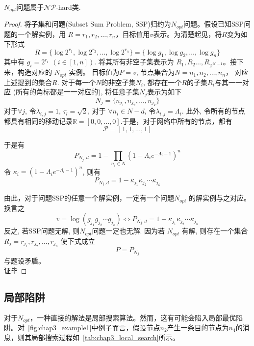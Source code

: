 \begin{theorem}
$N_{opt}$问题属于$\mathcal{NP}$-hard类. 
\label{thm:npc}
\end{theorem}
\begin{proof}
将子集和问题(Subset Sum Problem, SSP)归约为$N_{opt}$问题。假设已知SSP问题的一个解实例，用 $R={r_1,r_2,\ldots,r_n}$，目标值用$v$表示。为清楚起见，将$R$变为如下形式
\begin{displaymath}
R=\{\log 2^{r_1},\log 2^{r_2},\ldots,\log 2^{r_n}\}
=\{\log g_1,\log g_2,\ldots,\log g_n\}
\end{displaymath}
其中有 $g_i=2^{r_i}~~(i\in[1,n])$.
将其所有非空子集表示为 $R_1,R_2\ldots, R_{2^{|N|-1}}$。接下来，构造对应的 $N_{opt}$ 实例。 目标值为$P=v$, 节点集合为$N={n_1,n_2,\ldots,n_n}$， 对应上述提到的集合$R$. 对于每一个$N$的非空子集$N_i$, 都存在一个$R$的子集$R_i$与其一一对应 (所有的角标都是一一对应的), 将任意子集$N_j$表示为如下
\[
N_j=\{n_{j_1},n_{j_2},\ldots,n_{j_k}\}
\]
对于$\forall j$, 令$\lambda_{i,j}=1$, $\tau_{l}=\sqrt{2}$, 对于 $\forall n_i\in N-d$, 令$\lambda_{i,j}=\Lambda_i$. 此外, 令所有的节点都具有相同的移动记录$\mathbb{R}=[0,0,\ldots,0]$.于是，对于网络中所有的节点，都有
\[
\mathcal{P}=[1,1,\ldots,1]
\]

于是有
\[
P_{N_j,d}=1-\prod_{n_i\in N}(1-\Lambda_{i}e^{-\Lambda_i -1})^n
\]
令 $\kappa_i=\left(1-\Lambda_i e^{-\Lambda_i-1}\right)^{n}$, 则有
\[
P_{N_j,d}=1-\kappa_{j_1}\kappa_{j_2}\cdots\kappa_{j_k}
\]

由此，对于问题SSP的任意一个解实例，一定有一个问题$N_{opt}$ 的解实例与之对应。换言之
\[
v=\log (g_{j_1}g_{j_2}\cdots g_{j_k})\Longleftrightarrow P_{N_j,d}=1-\kappa_{j_1}\kappa_{j_2}\cdots\kappa_{j_n}
\]
反之, 若SSP问题无解, 则$N_{opt}$问题一定也无解. 因为若 $N_{opt}$ 有解, 则存在一个集合$R_j={r_{j_1},r_{j_2},\ldots,r_{j_n}}$ 使下式成立
\[
P=P_{N_j}
\]
与题设矛盾。\\
证毕
\end{proof}


\subsection{局部陷阱}

对于$N_{opt}$，一种直接的解法是局部搜索算法。然而，这有可能会陷入局部最优陷阱。对\figurename~\ref{fig:chap3_example1}中例子而言，假设节点$n_2$产生一条目的节点为$n_4$的消息，则其局部搜索过程如\tablename~\ref{tab:chap3_local_search}所示。

